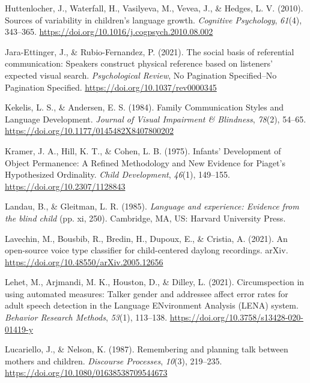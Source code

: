 \documentclass[
  man,floatsintext]{apa6}
\newlength{\cslhangindent}
\newlength{\cslentryspacingunit} %
\newenvironment{CSLReferences}[2] %
 {%
  \setlength{\parindent}{0pt}
  \ifodd #1
  \let\oldpar\par
  \def\par{\hangindent=\cslhangindent\oldpar}
  \fi
  \setlength{\parskip}{#2\cslentryspacingunit}
 }%
 {}
\begin{document}
\begin{CSLReferences}{1}{0}
\leavevmode{}%
Huttenlocher, J., Waterfall, H., Vasilyeva, M., Vevea, J., \& Hedges, L. V. (2010). Sources of variability in children's language growth. \emph{Cognitive Psychology}, \emph{61}(4), 343--365. \url{https://doi.org/10.1016/j.cogpsych.2010.08.002}

\leavevmode{}%
Jara-Ettinger, J., \& Rubio-Fernandez, P. (2021). The social basis of referential communication: {Speakers} construct physical reference based on listeners' expected visual search. \emph{Psychological Review}, No Pagination Specified--No Pagination Specified. \url{https://doi.org/10.1037/rev0000345}

\leavevmode{}%
Kekelis, L. S., \& Andersen, E. S. (1984). Family {Communication Styles} and {Language Development}. \emph{Journal of Visual Impairment \& Blindness}, \emph{78}(2), 54--65. \url{https://doi.org/10.1177/0145482X8407800202}

\leavevmode{}%
Kramer, J. A., Hill, K. T., \& Cohen, L. B. (1975). Infants' {Development} of {Object Permanence}: {A Refined Methodology} and {New Evidence} for {Piaget}'s {Hypothesized Ordinality}. \emph{Child Development}, \emph{46}(1), 149--155. \url{https://doi.org/10.2307/1128843}

\leavevmode{}%
Landau, B., \& Gleitman, L. R. (1985). \emph{Language and experience: {Evidence} from the blind child} (pp. xi, 250). {Cambridge, MA, US}: {Harvard University Press}.

\leavevmode{}%
Lavechin, M., Bousbib, R., Bredin, H., Dupoux, E., \& Cristia, A. (2021). An open-source voice type classifier for child-centered daylong recordings. {arXiv}. \url{https://doi.org/10.48550/arXiv.2005.12656}

\leavevmode{}%
Lehet, M., Arjmandi, M. K., Houston, D., \& Dilley, L. (2021). Circumspection in using automated measures: {Talker} gender and addressee affect error rates for adult speech detection in the {Language ENvironment Analysis} ({LENA}) system. \emph{Behavior Research Methods}, \emph{53}(1), 113--138. \url{https://doi.org/10.3758/s13428-020-01419-y}

\leavevmode{}%
Lucariello, J., \& Nelson, K. (1987). Remembering and planning talk between mothers and children. \emph{Discourse Processes}, \emph{10}(3), 219--235. \url{https://doi.org/10.1080/01638538709544673}


\end{CSLReferences}
\end{document}
